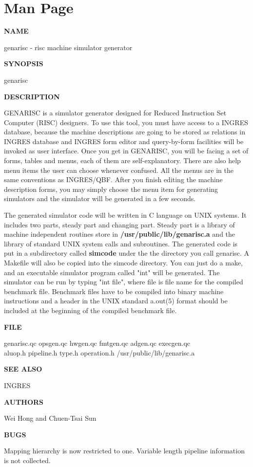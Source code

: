 %

\section{Man Page}
\label{app:man}

\noindent
{\bf NAME}

genarisc - risc machine simulator generator

\noindent
{\bf SYNOPSIS}

genarisc

\noindent
{\bf DESCRIPTION}

GENARISC is a simulator generator designed for Reduced
Instruction Set Computer (RISC) designers.
To use this tool, you must have access to a INGRES database,
because the machine descriptions are going to be stored as relations in
INGRES database and INGRES form editor and query-by-form facilities
will be invoked as user interface.  Once you get in GENARISC,
you will be facing a set of forms, tables and menus, each of them are
self-explanatory.  There are also help menu items the user can choose
whenever confused.  All the menus are in the same conventions as
INGRES/QBF.   After you finish editing the machine description forms,
you may simply choose the menu item for generating simulators and the simulator
will be generated in a few seconds.

The generated simulator code will be written in C language on UNIX
systems.  It includes two parts, steady part and changing part.
Steady part is a library of machine independent routines
store in {\bf /usr/public/lib/genarisc.a} and the library of
standard UNIX system calls and subroutines.
The generated code is put in a subdirectory called {\bf simcode} under
the the directory you call genarisc.
A Makefile will also be copied into the simcode directory.
You can just do a make, and an executable simulator program called "int" will
be generated.  The simulator can be run by typing "int file", where file
is file name for the compiled benchmark file.  Benchmark files have to
be compiled into binary machine instructions and a header in the UNIX
standard a.out(5) format should be included at the beginning of the compiled
benchmark file.

\noindent
{\bf FILE}

\noindent
genarisc.qc opsgen.qc hwgen.qc fmtgen.qc adgen.qc execgen.qc\\
aluop.h pipeline.h type.h operation.h /usr/public/lib/genarisc.a

\noindent
{\bf SEE ALSO}

INGRES

\noindent
{\bf AUTHORS}

Wei Hong and Chuen-Tsai Sun

\noindent
{\bf BUGS}

Mapping hierarchy is now restricted to one.  Variable length pipeline
information is not collected.


